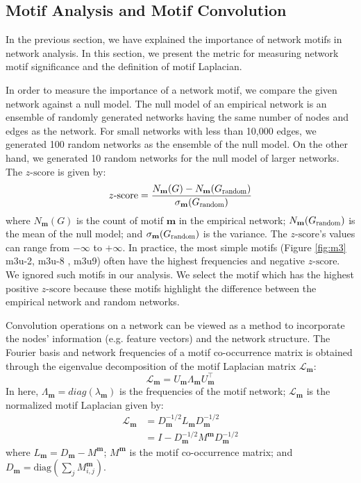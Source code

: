 \documentclass{article}
\theoremstyle{definition}
\begin{document}
\subsection{Motif Analysis and Motif Convolution}

In the previous section, we have explained the importance of
network motifs in network analysis. In this section, we present
the metric for measuring network motif significance and the definition
of motif Laplacian.

In order to measure the importance of a network motif, we compare
the given network against a null model. The null model of an empirical
network is an ensemble of randomly generated networks having the same
number of nodes and edges as the network. For small networks with less
than 10,000 edges, we generated 100 random networks as the ensemble of the
null model. On the other hand, we generated 10 random networks for the
null model of larger networks. The $z\mbox{-score}$ is given by:
\begin{equation*}
z\mbox{-score} = \frac{N_\mathbf{m}(G)-N_\mathbf{m}(G_{\scalebox{0.75}{random}})}{\sigma_\mathbf{m}(G_{\scalebox{0.75}{random}})}
\end{equation*}
where $N_\mathbf{m}(G)$ is the count of motif $\mathbf{m}$ in the
empirical network; $N_\mathbf{m}(G_{\scalebox{0.75}{random}})$ is the mean
of the null model; and $\sigma_\mathbf{m}(G_{\scalebox{0.75}{random}})$ is
the variance. The $z\mbox{-score}$'s values can range from
$-\infty$ to $+\infty$. In practice, the most simple motifs (Figure
\ref{fig:m3} m3u-2, m3u-8 , m3u9) often have the highest frequencies
and negative $z \mbox{-score}$. We ignored such motifs in our analysis.
We select the motif which has the highest positive $z\mbox{-score}$ because
these motifs highlight the difference between the empirical network and random
networks.

Convolution operations on a network can be viewed as a method to
incorporate the nodes' information (e.g. feature vectors)
and the network structure. The Fourier basis and network frequencies of
a motif co-occurrence matrix is obtained through the eigenvalue
decomposition of the motif Laplacian matrix $\mathcal{L}_{\mathbf{m}}$:
\begin{equation} \label{eq:eigm}
\mathcal{L}_{\mathbf{m}} = U_{\mathbf{m}} \Lambda_{\mathbf{m}}
U^{\top}_{\mathbf{m}}
\end{equation}
In here, $\Lambda_{\mathbf{m}} = diag(\lambda_{\mathbf{m}})$ is the
frequencies of the motif network; $\mathcal{L}_{\mathbf{m}}$ is the
normalized motif Laplacian given by:
\begin{equation}
\begin{aligned}
\mathcal{L}_{\mathbf{m}} &= D_{\mathbf{m}}^{-1/2} L_{\mathbf{m}}
D_{\mathbf{m}}^{-1/2} \\
&= I - D_{\mathbf{m}}^{-1/2} M^{\mathbf{m}} D_{\mathbf{m}}^{-1/2}
\end{aligned}
\label{eq:eigm}
\end{equation}
where $L_{\mathbf{m}} = D_{\mathbf{m}} - M^{\mathbf{m}}$; $M^{\mathbf{m}}$
is the motif co-occurrence matrix; and $D_{\mathbf{m}} = \mbox{diag}
( \sum_j M^{\mathbf{m}}_{i,j} )$.
\end{document}
